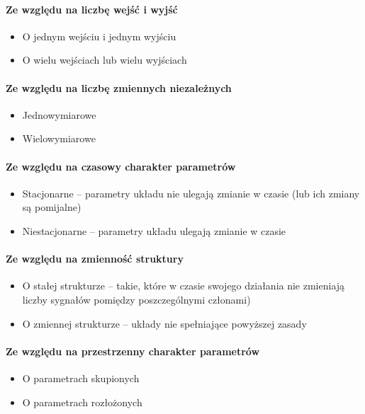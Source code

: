 \documentclass[a4paper,twoside]{report}
\begin{document}
\paragraph{Ze względu na liczbę wejść i wyjść}
\begin{itemize}
\item O jednym wejściu i jednym wyjściu
 \item  O wielu wejściach lub wielu wyjściach
\end{itemize}
\paragraph{Ze względu na  liczbę zmiennych niezależnych}
\begin{itemize}
\item Jednowymiarowe
 \item Wielowymiarowe
\end{itemize}

\paragraph{Ze względu na czasowy charakter parametrów}
\begin{itemize}
\item Stacjonarne – parametry układu nie ulegają zmianie w czasie (lub ich zmiany są pomijalne)
 \item Niestacjonarne – parametry układu ulegają zmianie w czasie
\end{itemize}

\paragraph{Ze względu  na zmienność struktury}
\begin{itemize}
\item O stałej strukturze – takie, które w czasie swojego działania nie zmieniają liczby sygnałów pomiędzy poszczególnymi członami)
 \item O zmiennej strukturze – układy nie spełniające powyższej zasady
\end{itemize}

\paragraph{Ze względu na przestrzenny charakter parametrów}
\begin{itemize}
\item O parametrach skupionych
 \item O parametrach rozłożonych
\end{itemize}
\end{document}
